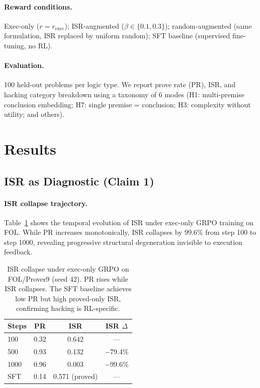 \documentclass[11pt,a4paper]{article}
\begin{document}
\paragraph{Reward conditions.}
Exec-only ($r = r_{\text{exec}}$); ISR-augmented ($\beta \in \{0.1, 0.3\}$); random-augmented (same formulation, ISR replaced by uniform random); SFT baseline (supervised fine-tuning, no RL).

\paragraph{Evaluation.}
100 held-out problems per logic type.
We report prove rate (PR), ISR, and hacking category breakdown using a taxonomy of 6 modes (H1: multi-premise conclusion embedding; H7: single premise = conclusion; H3: complexity without utility; and others).

\section{Results}
\label{sec:results}

\subsection{ISR as Diagnostic (Claim 1)}
\label{sec:claim1}

\paragraph{ISR collapse trajectory.}
Table~\ref{tab:isr_collapse} shows the temporal evolution of ISR under exec-only GRPO training on FOL.
While PR increases monotonically, ISR collapses by 99.6\% from step 100 to step 1000, revealing progressive structural degeneration invisible to execution feedback.

\begin{table}[t]
\centering
\small
\begin{tabular}{lccc}
\toprule
\textbf{Steps} & \textbf{PR} & \textbf{ISR} & \textbf{ISR $\Delta$} \\
\midrule
100 & 0.32 & 0.642 & --- \\
500 & 0.93 & 0.132 & $-$79.4\% \\
1000 & 0.96 & 0.003 & $-$99.6\% \\
\midrule
SFT & 0.14 & 0.571 (proved) & --- \\
\bottomrule
\end{tabular}
\caption{ISR collapse under exec-only GRPO on FOL/Prover9 (seed 42). PR rises while ISR collapses. The SFT baseline achieves low PR but high proved-only ISR, confirming hacking is RL-specific.}
\label{tab:isr_collapse}
\end{table}
\end{document}
